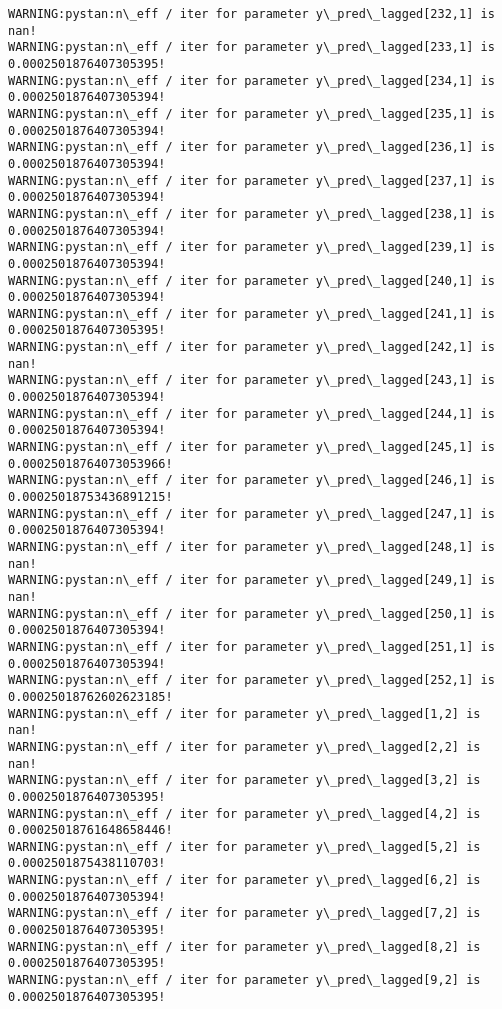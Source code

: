 \documentclass[11pt]{article}
\begin{document}
\begin{Verbatim}[commandchars=\\\{\}]
WARNING:pystan:n\_eff / iter for parameter y\_pred\_lagged[232,1] is nan!
WARNING:pystan:n\_eff / iter for parameter y\_pred\_lagged[233,1] is 0.0002501876407305395!
WARNING:pystan:n\_eff / iter for parameter y\_pred\_lagged[234,1] is 0.0002501876407305394!
WARNING:pystan:n\_eff / iter for parameter y\_pred\_lagged[235,1] is 0.0002501876407305394!
WARNING:pystan:n\_eff / iter for parameter y\_pred\_lagged[236,1] is 0.0002501876407305394!
WARNING:pystan:n\_eff / iter for parameter y\_pred\_lagged[237,1] is 0.0002501876407305394!
WARNING:pystan:n\_eff / iter for parameter y\_pred\_lagged[238,1] is 0.0002501876407305394!
WARNING:pystan:n\_eff / iter for parameter y\_pred\_lagged[239,1] is 0.0002501876407305394!
WARNING:pystan:n\_eff / iter for parameter y\_pred\_lagged[240,1] is 0.0002501876407305394!
WARNING:pystan:n\_eff / iter for parameter y\_pred\_lagged[241,1] is 0.0002501876407305395!
WARNING:pystan:n\_eff / iter for parameter y\_pred\_lagged[242,1] is nan!
WARNING:pystan:n\_eff / iter for parameter y\_pred\_lagged[243,1] is 0.0002501876407305394!
WARNING:pystan:n\_eff / iter for parameter y\_pred\_lagged[244,1] is 0.0002501876407305394!
WARNING:pystan:n\_eff / iter for parameter y\_pred\_lagged[245,1] is 0.00025018764073053966!
WARNING:pystan:n\_eff / iter for parameter y\_pred\_lagged[246,1] is 0.00025018753436891215!
WARNING:pystan:n\_eff / iter for parameter y\_pred\_lagged[247,1] is 0.0002501876407305394!
WARNING:pystan:n\_eff / iter for parameter y\_pred\_lagged[248,1] is nan!
WARNING:pystan:n\_eff / iter for parameter y\_pred\_lagged[249,1] is nan!
WARNING:pystan:n\_eff / iter for parameter y\_pred\_lagged[250,1] is 0.0002501876407305394!
WARNING:pystan:n\_eff / iter for parameter y\_pred\_lagged[251,1] is 0.0002501876407305394!
WARNING:pystan:n\_eff / iter for parameter y\_pred\_lagged[252,1] is 0.00025018762602623185!
WARNING:pystan:n\_eff / iter for parameter y\_pred\_lagged[1,2] is nan!
WARNING:pystan:n\_eff / iter for parameter y\_pred\_lagged[2,2] is nan!
WARNING:pystan:n\_eff / iter for parameter y\_pred\_lagged[3,2] is 0.0002501876407305395!
WARNING:pystan:n\_eff / iter for parameter y\_pred\_lagged[4,2] is 0.00025018761648658446!
WARNING:pystan:n\_eff / iter for parameter y\_pred\_lagged[5,2] is 0.0002501875438110703!
WARNING:pystan:n\_eff / iter for parameter y\_pred\_lagged[6,2] is 0.0002501876407305394!
WARNING:pystan:n\_eff / iter for parameter y\_pred\_lagged[7,2] is 0.0002501876407305395!
WARNING:pystan:n\_eff / iter for parameter y\_pred\_lagged[8,2] is 0.0002501876407305395!
WARNING:pystan:n\_eff / iter for parameter y\_pred\_lagged[9,2] is 0.0002501876407305395!

\end{Verbatim}
\end{document}
